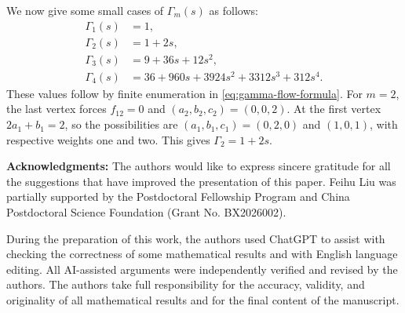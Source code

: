 \documentclass[reqno, 12pt]{article}
\numberwithin{equation}{section}
\theoremstyle{definition}
\begin{document}
We now give some small cases of $\Gamma_m(s)$ as follows:
\begin{align*}
\Gamma_1(s)&=1,\\
\Gamma_2(s)&=1+2s,\\
\Gamma_3(s)&=9+36s+12s^2,\\
\Gamma_4(s)&=36+960s+3924s^2+3312s^3+312s^4.
\end{align*}
These values follow by finite enumeration in \eqref{eq:gamma-flow-formula}. 
For $m=2$, the
last vertex forces $f_{12}=0$ and $(a_2,b_2,c_2)=(0,0,2)$.
At the first vertex $2a_1+b_1=2$, so the possibilities are
$(a_1,b_1,c_1)=(0,2,0)$ and $(1,0,1)$, with respective weights
one and two.  This gives $\Gamma_2=1+2s$.








\noindent
{\small \textbf{Acknowledgments:}}
The authors would like to express sincere gratitude for all the suggestions that have improved the presentation of this paper.
Feihu Liu was partially supported by the Postdoctoral Fellowship Program and China Postdoctoral Science Foundation (Grant No. BX2026002).



During the preparation of this work, the authors used ChatGPT to assist with checking the correctness of some mathematical results and with English language editing. All AI-assisted arguments were independently verified and revised by the authors.
The authors take full responsibility for the accuracy, validity, and originality of all mathematical results and for the final content of the manuscript.
\end{document}
